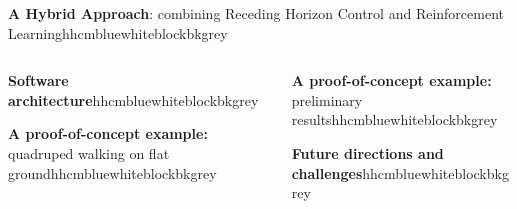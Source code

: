 \documentclass{beamer}
\begin{document}
	
	\begin{frame}[t]
		
			
		\begin{columns}[b]
			
			\begin{column}{0.955\textwidth}
				
				\begin{customblock}{\textbf{A Hybrid Approach}: combining Receding Horizon Control and Reinforcement Learning}{hhcmblue}{white}{blockbkgrey}
					
					
					
				\end{customblock}
		
			\end{column}
		
		\end{columns}
			
		\begin{columns}[T] 

			\begin{column}{.46\textwidth}
				
				\begin{customblock}{\textbf{Software architecture}}{hhcmblue}{white}{blockbkgrey}
					
				\end{customblock}
				\begin{customblock}{\textbf{A proof-of-concept example:} quadruped walking on flat ground}{hhcmblue}{white}{blockbkgrey}
					
				\end{customblock}
				
			\end{column}
			
			\begin{column}{.46\textwidth}
			
				\begin{customblock}{\textbf{A proof-of-concept example: } preliminary results}{hhcmblue}{white}{blockbkgrey}
					
				\end{customblock}
			
				
				\begin{customblock}{\textbf{Future directions and challenges}}{hhcmblue}{white}{blockbkgrey}
					
				\end{customblock}
			

\end{column}
\end{columns}
\end{frame}
\end{document}
